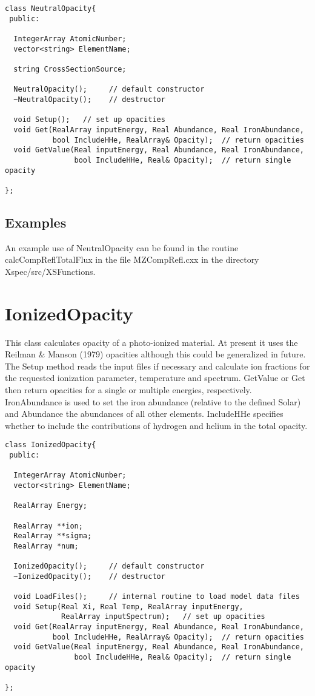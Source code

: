 \documentclass[11pt]{book}
\begin{document}
\begin{verbatim}
class NeutralOpacity{
 public:

  IntegerArray AtomicNumber;
  vector<string> ElementName;

  string CrossSectionSource;

  NeutralOpacity();     // default constructor
  ~NeutralOpacity();    // destructor

  void Setup();   // set up opacities
  void Get(RealArray inputEnergy, Real Abundance, Real IronAbundance, 
           bool IncludeHHe, RealArray& Opacity);  // return opacities 
  void GetValue(Real inputEnergy, Real Abundance, Real IronAbundance, 
                bool IncludeHHe, Real& Opacity);  // return single opacity 

};
\end{verbatim}

\section{Examples}

An example use of NeutralOpacity can be found in the routine
calcCompReflTotalFlux in the file MZCompRefl.cxx in the directory 
Xspec/src/XSFunctions.

\chapter{IonizedOpacity}

This class calculates opacity of a photo-ionized material. At present
it uses the Reilman \& Manson (1979) opacities although this could be
generalized in future. The Setup method reads the input files if
necessary and calculate ion fractions for the requested ionization
parameter, temperature and spectrum. GetValue or Get then return opacities
for a single or multiple energies, respectively. IronAbundance is used
to set the iron abundance (relative to the defined Solar) and
Abundance the abundances of all other elements. IncludeHHe specifies
whether to include the contributions of hydrogen and helium in
the total opacity. 

\begin{verbatim}
class IonizedOpacity{
 public:

  IntegerArray AtomicNumber;
  vector<string> ElementName;

  RealArray Energy;

  RealArray **ion;
  RealArray **sigma;
  RealArray *num;

  IonizedOpacity();     // default constructor
  ~IonizedOpacity();    // destructor

  void LoadFiles();     // internal routine to load model data files
  void Setup(Real Xi, Real Temp, RealArray inputEnergy, 
             RealArray inputSpectrum);   // set up opacities
  void Get(RealArray inputEnergy, Real Abundance, Real IronAbundance, 
           bool IncludeHHe, RealArray& Opacity);  // return opacities 
  void GetValue(Real inputEnergy, Real Abundance, Real IronAbundance, 
                bool IncludeHHe, Real& Opacity);  // return single opacity 

};
\end{verbatim}
\end{document}
